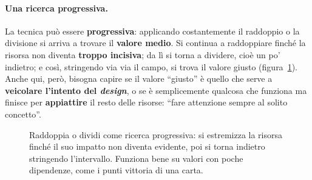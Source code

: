 \paragraph{Una ricerca progressiva.} La tecnica può essere \textbf{progressiva}: applicando
costantemente il raddoppio o la divisione si arriva a trovare il \textbf{valore medio}. Si
continua a raddoppiare finché la risorsa non diventa \textbf{troppo incisiva}; da lì si torna
a dividere, cioè un po' indietro; e così, stringendo via via il campo, si trova il valore
giusto (figura~\ref{a14:fig:raddoppia}). Anche qui, però, bisogna capire se il valore
``giusto'' è quello che serve a \textbf{veicolare l'intento del \emph{design}}, o se è
semplicemente qualcosa che funziona ma finisce per \textbf{appiattire} il resto delle risorse:
``fare attenzione sempre al solito concetto''.

\begin{figure}[htbp]
\centering
{}
\caption{Raddoppia o dividi come ricerca progressiva: si estremizza la risorsa finché il suo
impatto non diventa evidente, poi si torna indietro stringendo l'intervallo. Funziona bene su
valori con poche dipendenze, come i punti vittoria di una carta.}
\label{a14:fig:raddoppia}
\end{figure}

